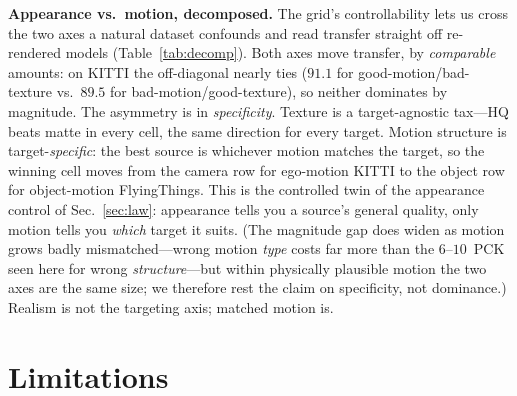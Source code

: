 \documentclass[runningheads]{llncs}
\newcommand{\pck}{PCK}
\begin{document}
\noindent\textbf{Appearance vs.\ motion, decomposed.}
The grid's controllability lets us cross the two axes a natural dataset
confounds and read transfer straight off re-rendered models
(Table~\ref{tab:decomp}). Both axes move transfer, by \emph{comparable}
amounts: on KITTI the off-diagonal nearly ties
($91.1$ for good-motion/bad-texture vs.\ $89.5$ for bad-motion/good-texture), so
neither dominates by magnitude. The asymmetry is in \emph{specificity}.
Texture is a target-agnostic tax---HQ beats matte in every cell, the same
direction for every target. Motion structure is target-\emph{specific}: the best
source is whichever motion matches the target, so the winning cell moves from the
camera row for ego-motion KITTI to the object row for object-motion
FlyingThings. This is the controlled twin of the appearance control of
Sec.~\ref{sec:law}: appearance tells you a source's general quality, only motion
tells you \emph{which} target it suits. (The magnitude gap does widen as motion
grows badly mismatched---wrong motion \emph{type} costs far more than the
$6$--$10$~\pck{} seen here for wrong \emph{structure}---but within physically
plausible motion the two axes are the same size; we therefore rest the claim on
specificity, not dominance.) Realism is not the targeting axis; matched motion
is.

\section{Limitations}
\label{sec:limits}
\end{document}
